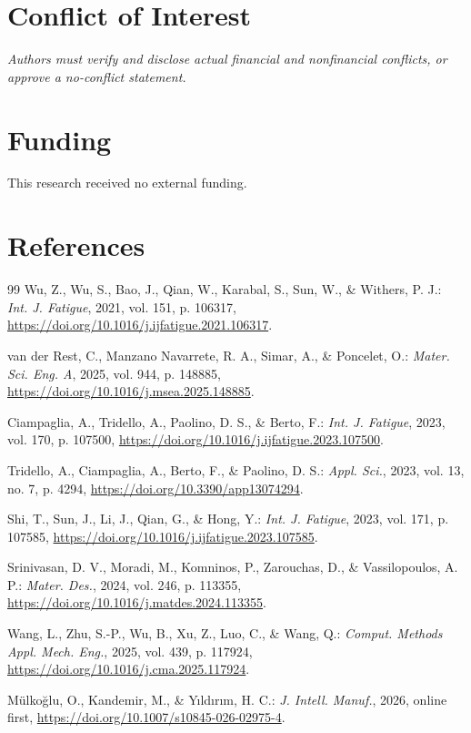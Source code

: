 \documentclass[12pt,a4paper]{article}
\begin{document}
\section*{Conflict of Interest}
\textit{Authors must verify and disclose actual financial and nonfinancial conflicts, or approve a no-conflict statement.}

\section*{Funding}
This research received no external funding.

\section*{References}
\begin{thebibliography}{99}
Wu, Z., Wu, S., Bao, J., Qian, W., Karabal, S., Sun, W., \& Withers, P. J.: \emph{Int. J. Fatigue}, 2021, vol. 151, p. 106317, \url{https://doi.org/10.1016/j.ijfatigue.2021.106317}.

van der Rest, C., Manzano Navarrete, R. A., Simar, A., \& Poncelet, O.: \emph{Mater. Sci. Eng. A}, 2025, vol. 944, p. 148885, \url{https://doi.org/10.1016/j.msea.2025.148885}.

Ciampaglia, A., Tridello, A., Paolino, D. S., \& Berto, F.: \emph{Int. J. Fatigue}, 2023, vol. 170, p. 107500, \url{https://doi.org/10.1016/j.ijfatigue.2023.107500}.

Tridello, A., Ciampaglia, A., Berto, F., \& Paolino, D. S.: \emph{Appl. Sci.}, 2023, vol. 13, no. 7, p. 4294, \url{https://doi.org/10.3390/app13074294}.

Shi, T., Sun, J., Li, J., Qian, G., \& Hong, Y.: \emph{Int. J. Fatigue}, 2023, vol. 171, p. 107585, \url{https://doi.org/10.1016/j.ijfatigue.2023.107585}.

Srinivasan, D. V., Moradi, M., Komninos, P., Zarouchas, D., \& Vassilopoulos, A. P.: \emph{Mater. Des.}, 2024, vol. 246, p. 113355, \url{https://doi.org/10.1016/j.matdes.2024.113355}.

Wang, L., Zhu, S.-P., Wu, B., Xu, Z., Luo, C., \& Wang, Q.: \emph{Comput. Methods Appl. Mech. Eng.}, 2025, vol. 439, p. 117924, \url{https://doi.org/10.1016/j.cma.2025.117924}.

Mülkoğlu, O., Kandemir, M., \& Yıldırım, H. C.: \emph{J. Intell. Manuf.}, 2026, online first, \url{https://doi.org/10.1007/s10845-026-02975-4}.


\end{thebibliography}
\end{document}
